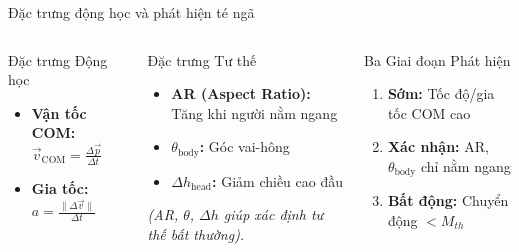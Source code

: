 \begin{frame}{Đặc trưng động học và phát hiện té ngã}
    \begin{columns}[T]
        \begin{block}{Đặc trưng Động học}
            \begin{itemize}
                \item \textbf{Vận tốc COM:} $\vec{v}_{\text{COM}} = \frac{\Delta \vec{p}}{\Delta t}$
                \item \textbf{Gia tốc:} $a = \frac{\|\Delta \vec{v}\|}{\Delta t}$
            \end{itemize}
        \end{block}
        \begin{block}{Đặc trưng Tư thế}
            \begin{itemize}
                \item \textbf{AR (Aspect Ratio):} Tăng khi người nằm ngang
                \item \textbf{$\theta_{\text{body}}$:} Góc vai-hông
                \item \textbf{$\Delta h_{\text{head}}$:} Giảm chiều cao đầu
            \end{itemize}
            \small{\textit{(AR, $\theta$, $\Delta h$ giúp xác định tư thế bất thường).}}
        \end{block}

        \begin{alertblock}{Ba Giai đoạn Phát hiện}
            \begin{enumerate}
                \item \textbf{Sớm:} Tốc độ/gia tốc COM cao
                \item \textbf{Xác nhận:} AR, $\theta_{\text{body}}$ chỉ nằm ngang
                \item \textbf{Bất động:} Chuyển động $< M_{th}$
            \end{enumerate}
        \end{alertblock}
    \end{columns}
\end{frame}

